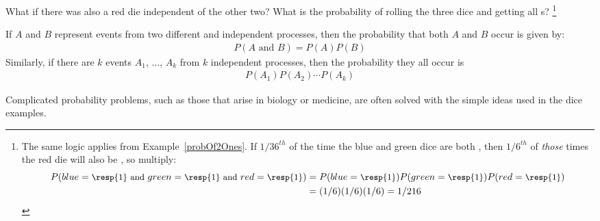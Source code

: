 \begin{exercise}{What if there was also a red die independent of the other two? What is the probability of rolling the three dice and getting all s?}\label{threeDice}
\footnote{The same logic applies from Example~\ref{probOf2Ones}. If $1/36^{th}$ of the time the blue and green dice are both , then $1/6^{th}$ of \emph{those} times the red die will also be , so multiply:
{\begin{align*}
P(blue=\text{\small\resp{1} and } green=\text{\small\resp{1} and } red=\text{\small\resp{1}})
	&= P(blue=\text{\small\resp{1}}) P(green=\text{\small\resp{1}}) P(red=\text{\small\resp{1}}) \\
	&= (1/6) (1/6) (1/6)
	= 1/216
\end{align*}} \vspace{-7mm}
}
\end{exercise}


\begin{termBox}{
If $A$ and $B$ represent events from two different and independent processes, then the probability that both $A$ and $B$ occur is given by: \vspace{-1.5mm}
\begin{eqnarray}\label{eqForIndependentEvents}
P(A \text{ and }B) = P(A)  P(B)
\end{eqnarray}
Similarly, if there are $k$ events $A_1$, ..., $A_k$ from $k$ independent processes, then the probability they all occur is\vspace{-1.5mm}
\begin{eqnarray*}
P(A_1) P(A_2) \cdots P(A_k)
\end{eqnarray*}\vspace{-6mm}}
\end{termBox}

Complicated probability problems, such as those that arise in biology or medicine, are often solved with the simple ideas used in the dice examples. 



